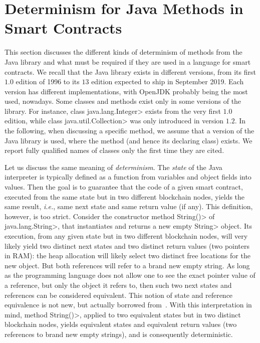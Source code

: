 \section{Determinism for Java Methods in Smart Contracts}\label{sec:determinism}

This section discusses the different kinds of determinism of methods from
the Java library and what must be required if they are used
in a language for smart contracts.
We recall that the Java library exists in different versions, from its first
$1.0$ edition of 1996 to its $13$ edition expected to ship in September 2019.
Each version has different implementations, with OpenJDK probably being
the most used, nowadays. Some classes and methods exist only in some versions of the library.
For instance, class \<java.lang.Integer> exists from the very first $1.0$ edition,
while class \<java.util.Collection> was only introduced in version $1.2$.
In the following, when discussing a specific method, we assume that a version
of the Java library is used, where the method (and hence its declaring class) exists.
We report fully qualified names of classes only the first time they are cited.

Let us discuss the same meaning of \emph{determinism}.
The \emph{state} of the Java interpreter is typically defined
as a function from variables and object fields into values.
Then the goal is to guarantee that the code of a given smart contract, executed
from the same state but in two different blockchain nodes, yields the same result, \emph{i.e.},
same next state and same return value (if any).
This definition, however, is too strict. Consider the constructor method
\<String()> of \<java.lang.String>, that instantiates and returns a new empty \<String>
object. Its execution, from any given state but in two different blockchain nodes,
will very likely yield two distinct next states and two
distinct return values (two pointers in RAM): the heap allocation will likely
select two distinct free locations for the new object.
But both references will refer to a brand new empty string.
As long as the programming language does not allow one to see
the exact pointer value of a reference, but only the object it refers to,
then such two next states and references can be considered equivalent.
This notion of state and reference equivalence is not new, but actually borrowed
from~\cite{BanerjeeN05,BarthePR13}.
With this interpretation in mind, method \<String()>, applied to two equivalent
states but in two distinct blockchain nodes,
yields equivalent states and equivalent return values (two references to
brand new empty strings), and is consequently deterministic.


